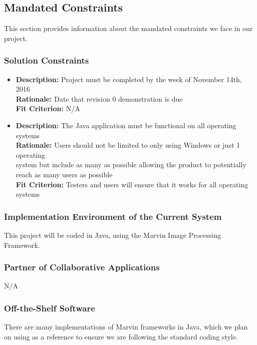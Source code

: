 \documentclass[12pt, titlepage]{article}
\begin{document}
\subsection{Mandated Constraints}
This section provides information about the mandated constraints we face in our project.
\subsubsection{Solution Constraints}
\begin{itemize}
  \item {\bf Description:} Project must be completed by the week of November 14th, 2016\\
        {\bf Rationale:} Date that revision 0 demonstration is due\\
        {\bf Fit Criterion:} N/A \\
  \item {\bf Description:} The Java application must be functional on all operating systems\\
        {\bf Rationale:} Users should not be limited to only using Windows or just 1 operating\\ system but include as many as possible allowing the product to potentially reach as many users as possible\\
        {\bf Fit Criterion:} Testers and users will ensure that it works for all operating systems
  \end{itemize}
  
\subsubsection{Implementation Environment of the Current System}

This project will be coded in Java, using the Marvin Image Processing Framework.

\subsubsection{Partner of Collaborative Applications}

N/A

\subsubsection{Off-the-Shelf Software}

There are many implementations of Marvin frameworks in Java, which we plan on using as a reference to ensure we are following the standard coding style.
\end{document}
